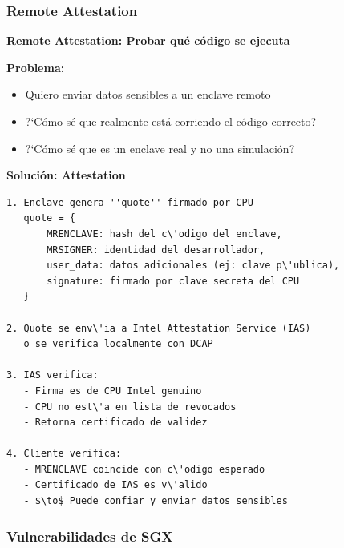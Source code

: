 \documentclass[11pt,a4paper,twoside]{book}
\begin{document}
\subsubsection{Remote Attestation}

\begin{keyidea}
\textbf{Remote Attestation: Probar qu\'e c\'odigo se ejecuta}

\textbf{Problema:}
\begin{itemize}
    \item Quiero enviar datos sensibles a un enclave remoto
    \item ?`C\'omo s\'e que realmente est\'a corriendo el c\'odigo correcto?
    \item ?`C\'omo s\'e que es un enclave real y no una simulaci\'on?
\end{itemize}

\textbf{Soluci\'on: Attestation}

\begin{verbatim}
1. Enclave genera ''quote'' firmado por CPU
   quote = {
       MRENCLAVE: hash del c\'odigo del enclave,
       MRSIGNER: identidad del desarrollador,
       user_data: datos adicionales (ej: clave p\'ublica),
       signature: firmado por clave secreta del CPU
   }

2. Quote se env\'ia a Intel Attestation Service (IAS)
   o se verifica localmente con DCAP

3. IAS verifica:
   - Firma es de CPU Intel genuino
   - CPU no est\'a en lista de revocados
   - Retorna certificado de validez

4. Cliente verifica:
   - MRENCLAVE coincide con c\'odigo esperado
   - Certificado de IAS es v\'alido
   - $\to$ Puede confiar y enviar datos sensibles
\end{verbatim}
\end{keyidea}

\subsubsection{Vulnerabilidades de SGX}
\end{document}
